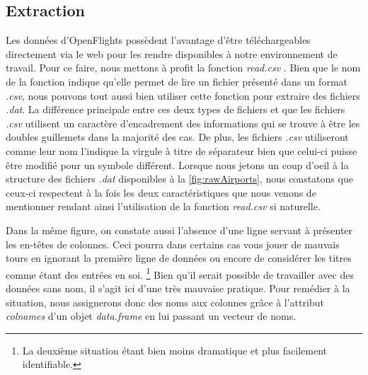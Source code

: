 \subsection{Extraction}

\label{subsec:extraction}
Les données d'OpenFlights possèdent l'avantage d'être téléchargeables directement via le web pour les rendre disponibles à notre environnement de travail. Pour ce faire, nous mettons à profit la fonction \emph{read.csv} \cite{Rfunction:read.csv}. Bien que le nom de la fonction indique qu'elle permet de lire un fichier présenté dans un format \emph{.csv}, nous pouvons tout aussi bien utiliser cette fonction pour extraire des fichiers \emph{.dat}. La différence principale entre ces deux types de fichiers et que les fichiers \emph{.csv} utilisent un caractère d'encadrement des informations qui se trouve à être les doubles guillemets dans la majorité des cas. De plus, les fichiers \emph{.csv} utiliseront comme leur nom l'indique la virgule à titre de séparateur bien que celui-ci puisse être modifié pour un symbole différent.\cite{CSVDAT} Lorsque nous jetons un coup d'oeil à la structure des fichiers \emph{.dat} disponibles à la \autoref{fig:rawAirports}, nous constatons que ceux-ci respectent à la fois les deux caractéristiques que nous venons de mentionner rendant ainsi l'utilisation de la fonction \emph{read.csv} si naturelle. \\


Dans la même figure, on constate aussi l'absence d'une ligne servant à présenter les en-têtes de colonnes. Ceci pourra dans certains cas vous jouer de mauvais tours en ignorant la première ligne de données ou encore de considérer les titres comme étant des entrées en soi. \footnote{La deuxième situation étant bien moins dramatique et plus facilement identifiable.}  Bien qu'il serait possible de travailler avec des données sans nom, il s'agit ici d'une très mauvaise pratique. Pour remédier à la situation, nous assignerons donc des noms aux colonnes grâce à l'attribut \emph{colnames} d'un objet \emph{data.frame} en lui passant un vecteur de noms.\\

